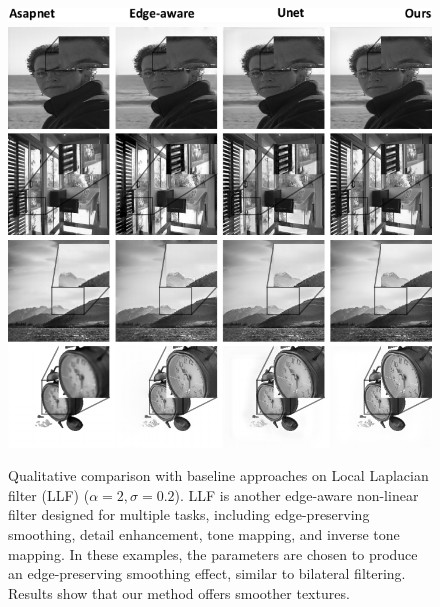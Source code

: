 
\begin{figure}%
  \centering
      \includegraphics[width=.82\linewidth]{Chapters/detail-retouching-figs/One-shot-labels.pdf}
  \includegraphics[width=\linewidth]{Chapters/detail-retouching-figs/Qualitative_zoomed_LLF_a2_s02.pdf}
    \caption{Qualitative comparison with baseline approaches on Local Laplacian filter (LLF) ($\alpha=2, \sigma=0.2$). LLF is another edge-aware non-linear filter designed for multiple tasks, including edge-preserving smoothing, detail enhancement, tone mapping, and inverse tone mapping. In these examples, the parameters are chosen to produce an edge-preserving smoothing effect, similar to bilateral filtering. Results show that our method offers smoother textures.} 

   \label{fig:QualitativeComp_LLF_a2}%
\end{figure}

